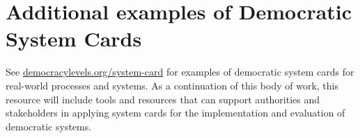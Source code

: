\documentclass{article}
\begin{document}


\clearpage

\section{Additional examples of Democratic System Cards}

    See \href{https://democracylevels.org/system-card}{democracylevels.org/system-card} for examples of democratic system cards for real-world processes and systems. As a continuation of this body of work, this resource will include tools and resources that can support authorities and stakeholders in applying system cards for the implementation and evaluation of democratic systems.
\end{document}
